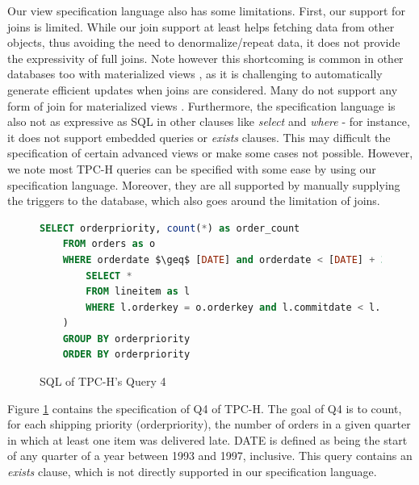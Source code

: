 \documentclass[sigplan,review,anonymous]{acmart}
\begin{document}
Our view specification language also has some limitations.
First, our support for joins is limited. While our join support at least helps fetching data from other objects, thus avoiding the need to denormalize/repeat data, it does not provide the expressivity of full joins.
Note however this shortcoming is common in other databases too with materialized views \cite{???}, as it is challenging to automatically generate efficient updates when joins are considered. Many do not support any form of join for materialized views \cite{???}.
Furthermore, the specification language is also not as expressive as SQL in other clauses like \emph{select} and \emph{where} - for instance, it does not support embedded queries or \emph{exists} clauses.
This may difficult the specification of certain advanced views or make some cases not possible.
However, we note most TPC-H queries can be specified with some ease by using our specification language.
Moreover, they are all supported by manually supplying the triggers to the database, which also goes around the limitation of joins.

\begin{figure}[h]
	\begin{lstlisting}[language=SQL]
	SELECT orderpriority, count(*) as order_count
	FROM orders as o
	WHERE orderdate $\geq$ [DATE] and orderdate < [DATE] + 3 month and exists (
		SELECT *
		FROM lineitem as l
		WHERE l.orderkey = o.orderkey and l.commitdate < l.receiptdate
	)
	GROUP BY orderpriority
	ORDER BY orderpriority
	\end{lstlisting}
	\caption{SQL of TPC-H's Query 4}
	\label{fig:query4}
\end{figure}

Figure \ref{fig:query4} contains the specification of Q4 of TPC-H.
The goal of Q4 is to count, for each shipping priority (orderpriority), the number of orders in a given quarter in which at least one item was delivered late.
DATE is defined as being the start of any quarter of a year between 1993 and 1997, inclusive.
This query contains an \emph{exists} clause, which is not directly supported in our specification language.
\end{document}
